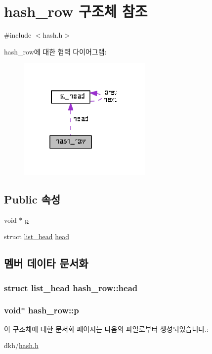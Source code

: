 \hypertarget{structhash__row}{\section{hash\+\_\+row 구조체 참조}
\label{structhash__row}
}


{\ttfamily \#include $<$hash.\+h$>$}



hash\+\_\+row에 대한 협력 다이어그램\+:\nopagebreak
\begin{figure}[H]
\begin{center}
\leavevmode
\includegraphics[width=184pt]{structhash__row__coll__graph}
\end{center}
\end{figure}
\subsection*{Public 속성}
\begin{DoxyCompactItemize}
\item 
void $\ast$ \hyperlink{structhash__row_a270cca5040fb8c27a8b5595cc921d960}{p}
\item 
struct \hyperlink{structlist__head}{list\+\_\+head} \hyperlink{structhash__row_aeef0a2f42e9fa516efe336bba7a990d4}{head}
\end{DoxyCompactItemize}


\subsection{멤버 데이타 문서화}
\hypertarget{structhash__row_aeef0a2f42e9fa516efe336bba7a990d4}{
\subsubsection[{head}]{\setlength{\rightskip}{0pt plus 5cm}struct {\bf list\+\_\+head} hash\+\_\+row\+::head}}\label{structhash__row_aeef0a2f42e9fa516efe336bba7a990d4}
\hypertarget{structhash__row_a270cca5040fb8c27a8b5595cc921d960}{
\subsubsection[{p}]{\setlength{\rightskip}{0pt plus 5cm}void$\ast$ hash\+\_\+row\+::p}}\label{structhash__row_a270cca5040fb8c27a8b5595cc921d960}


이 구조체에 대한 문서화 페이지는 다음의 파일로부터 생성되었습니다.\+:\begin{DoxyCompactItemize}
\item 
dkh/\hyperlink{hash_8h}{hash.\+h}\end{DoxyCompactItemize}
